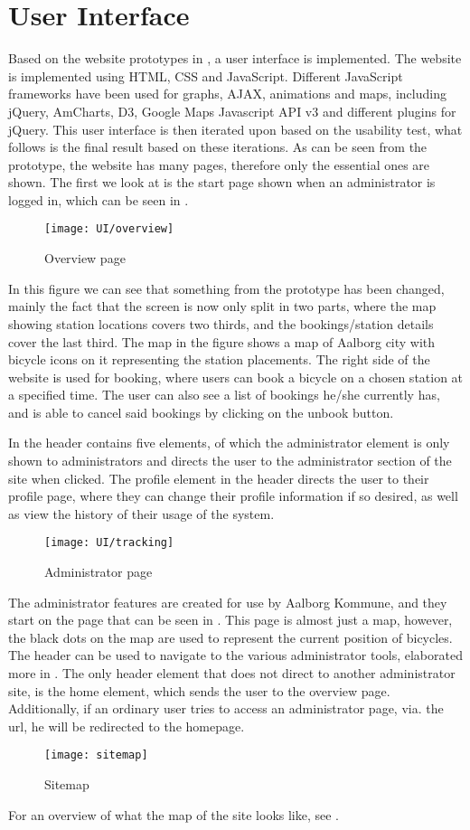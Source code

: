 \section{User Interface}

Based on the website prototypes in , a user interface is implemented.
The website is implemented using HTML, CSS and JavaScript. 
Different JavaScript frameworks have been used for graphs, AJAX, animations and maps, including jQuery, AmCharts, D3, Google Maps Javascript API v3 and different plugins for jQuery.
This user interface is then iterated upon based on the usability test, what follows is the final result based on these iterations. 
As can be seen from the prototype, the website has many pages, therefore only the essential ones are shown.
The first we look at is the start page shown when an administrator is logged in, which can be seen in .

\begin{figure}[h]
	\centering
	\texttt{[image: UI/overview]}
	\caption{Overview page}\label{fig:UI-overview}
\end{figure}

In this figure we can see that something from the prototype has been changed, mainly the fact that the screen is now only split in two parts, where the map showing station locations covers two thirds, and the bookings/station details cover the last third.
The map in the figure shows a map of Aalborg city with bicycle icons on it representing the station placements.
The right side of the website is used for booking, where users can book a bicycle on a chosen station at a specified time.
The user can also see a list of bookings he/she currently has, and is able to cancel said bookings by clicking on the unbook button.

In  the header contains five elements, of which the administrator element is only shown to administrators and directs the user to the administrator section of the site when clicked.
The profile element in the header directs the user to their profile page, where they can change their profile information if so desired, as well as view the history of their usage of the system.

\begin{figure}[h]
	\centering
	\texttt{[image: UI/tracking]}
	\caption{Administrator page}\label{fig:UI-admin}
\end{figure}

The administrator features are created for use by Aalborg Kommune, and they start on the page that can be seen in .
This page is almost just a map, however, the black dots on the map are used to represent the current position of bicycles.
The header can be used to navigate to the various administrator tools, elaborated more in .
The only header element that does not direct to another administrator site, is the home element, which sends the user to the overview page.
Additionally, if an ordinary user tries to access an administrator page, via. the url, he will be redirected to the homepage.

\begin{figure}[h]
	\centering
	\texttt{[image: sitemap]}
	\caption{Sitemap}\label{fig:sitemap}
\end{figure}

For an overview of what the map of the site looks like, see .
